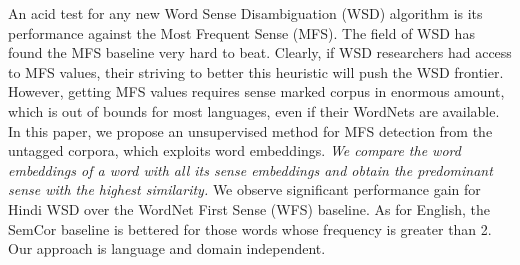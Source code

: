 An acid test for any new Word Sense Disambiguation (WSD) algorithm is its performance against the Most Frequent Sense (MFS). The field of WSD has found the MFS baseline very hard to beat. Clearly, if WSD researchers had access to MFS values, their striving to better this heuristic will push the WSD frontier. However, getting MFS values requires sense marked corpus in enormous amount, which is out of bounds for most languages, even if their WordNets are available. In this paper, we propose an unsupervised method for MFS detection from the untagged corpora, which exploits word embeddings. \textit{We compare the word embeddings of a word with all its sense embeddings and obtain the predominant sense with the highest similarity.} We observe significant performance gain for Hindi WSD over the WordNet First Sense (WFS) baseline. As for English, the SemCor baseline is bettered for those words whose frequency is greater than 2. Our approach is language and domain independent.

